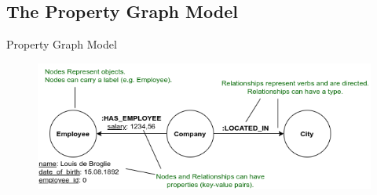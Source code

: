 \documentclass[rgb]{beamer}
\begin{document}
            \subsection{The Property Graph Model}
                \begin{frame}{Property Graph Model}
                    \begin{figure}
                     \begin{center}
                      \includegraphics[keepaspectratio, height=0.8\textheight, width=.8\textwidth]{img/property_graph_elements.png}
                     \end{center}
                    \end{figure}
                \end{frame}
        
\end{document}
